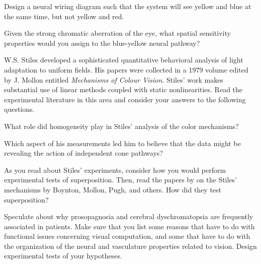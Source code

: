  \item Design a neural wiring diagram such that the system
will see yellow and blue at the same time, but not yellow and red.

 \item Given the strong chromatic aberration of the eye, what spatial
sensitivity properties would you assign to the blue-yellow neural pathway?

 \ee

\item W.S. Stiles developed a sophisticated quantitative
behavioral analysis of light adaptation to uniform fields.  His papers
were collected in a 1979 volume edited by J. Mollon entitled {\em
Mechanisms of Colour Vision}.  Stiles' work makes substantial use of
linear methods coupled with static nonlinearities.  Read the
experimental literature in this area and consider your answers to the
following questions.

 \be

 \item What role did homogeneity play in Stiles' analysis of the color
mechanisms?

  \item Which aspect of his measurements led him to believe that the
data might be revealing the action of independent cone pathways?

 \item As you read about Stiles' experiments, consider how you would
perform experimental tests of superposition.  Then, read the papers by
on the Stiles' mechanisms by Boynton, Mollon, Pugh, and others.  How
did they test superposition?

 \ee

\item Speculate about why prosopagnosia and cerebral dyschromatopsia
are frequently associated in patients.  Make sure that you list some
reasons that have to do with functional issues concerning visual
computation, and some that have to do with the organization of the
neural and vasculature properties related to vision.  Design
experimental tests of your hypotheses.

\ee %

